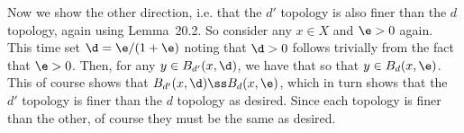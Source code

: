 {{    Now we show the other direction, i.e. that the $d'$ topology is also finer than the $d$ topology, again using Lemma~20.2.
    So consider any $x \in X$ and $\e > 0$ again.
    This time set $\d = \e / (1+\e)$ noting that $\d > 0$ follows trivially from the fact that $\e > 0$.
    Then, for any $y \in B_{d'}(x, \d)$, we have that
    so that $y \in B_d(x, \e)$.
    This of course shows that $B_{d'}(x, \d) \ss B_d(x, \e)$, which in turn shows that the $d'$ topology is finer than the $d$ topology as desired.
    Since each topology is finer than the other, of course they must be the same as desired.
  }
}
